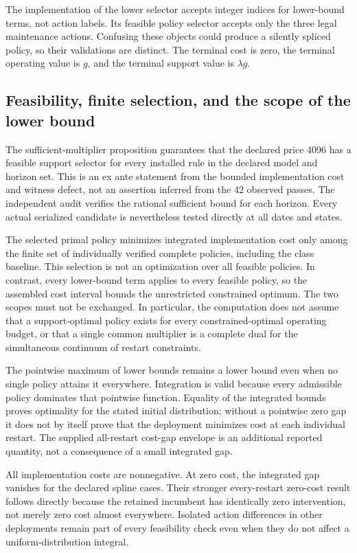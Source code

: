 The implementation of the lower selector accepts integer indices for lower-bound terms, not action labels. Its feasible policy selector accepts only the three legal maintenance actions. Confusing these objects could produce a silently spliced policy, so their validations are distinct. The terminal cost is zero, the terminal operating value is $g$, and the terminal support value is $\lambda g$.

\subsection{Feasibility, finite selection, and the scope of the lower bound}
The sufficient-multiplier proposition guarantees that the declared price 4096 has a feasible support selector for every installed rule in the declared model and horizon set. This is an ex ante statement from the bounded implementation cost and witness defect, not an assertion inferred from the 42 observed passes. The independent audit verifies the rational sufficient bound for each horizon. Every actual serialized candidate is nevertheless tested directly at all dates and states.

The selected primal policy minimizes integrated implementation cost only among the finite set of individually verified complete policies, including the class baseline. This selection is not an optimization over all feasible policies. In contrast, every lower-bound term applies to every feasible policy, so the assembled cost interval bounds the unrestricted constrained optimum. The two scopes must not be exchanged. In particular, the computation does not assume that a support-optimal policy exists for every constrained-optimal operating budget, or that a single common multiplier is a complete dual for the simultaneous continuum of restart constraints.

The pointwise maximum of lower bounds remains a lower bound even when no single policy attains it everywhere. Integration is valid because every admissible policy dominates that pointwise function. Equality of the integrated bounds proves optimality for the stated initial distribution; without a pointwise zero gap it does not by itself prove that the deployment minimizes cost at each individual restart. The supplied all-restart cost-gap envelope is an additional reported quantity, not a consequence of a small integrated gap.

All implementation costs are nonnegative. At zero cost, the integrated gap vanishes for the declared spline cases. Their stronger every-restart zero-cost result follows directly because the retained incumbent has identically zero intervention, not merely zero cost almost everywhere. Isolated action differences in other deployments remain part of every feasibility check even when they do not affect a uniform-distribution integral.

